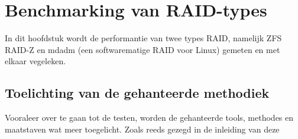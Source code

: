 

\chapter{Benchmarking van RAID-types}
\label{ch:h8}

In dit hoofdstuk wordt de performantie van twee types RAID, namelijk ZFS RAID-Z en mdadm (een softwarematige RAID voor Linux) gemeten en met elkaar vegeleken.

\section{Toelichting van de gehanteerde methodiek}

Vooraleer over te gaan tot de testen, worden de gehanteerde tools, methodes en maatstaven wat meer toegelicht. Zoals reeds gezegd in de inleiding van deze
